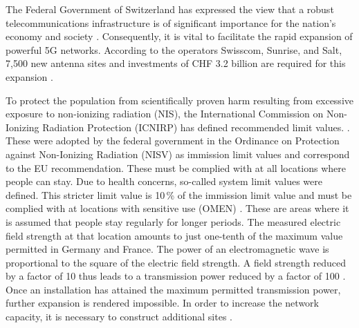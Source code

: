 \begin{English}
    The Federal Government of Switzerland has expressed the view that a robust telecommunications infrastructure is of significant importance for the nation's economy and society \cite{bundesratNachhaltigesMobilfunknetzBericht2022}. Consequently, it is vital to facilitate the rapid expansion of powerful 5G networks. According to the operators Swisscom, Sunrise, and Salt, 7,500 new antenna sites and investments of CHF 3.2 billion are required for this expansion \cite{bundesratNachhaltigesMobilfunknetzBericht2022}.

    To protect the population from scientifically proven harm resulting from excessive exposure to non-ionizing radiation (NIS), the International Commission on Non-Ionizing Radiation Protection (ICNIRP) has defined recommended limit values. \cite{baumannMitVerordnungUeber2005}. These were adopted by the federal government in the Ordinance on Protection against Non-Ionizing Radiation (NISV) as immission limit values and correspond to the EU recommendation. These must be complied with at all locations where people can stay. Due to health concerns, so-called system limit values were defined. This stricter limit value is 10\,\% of the immission limit value and must be complied with at locations with sensitive use (OMEN) \cite{baumannMitVerordnungUeber2005}. These are areas where it is assumed that people stay regularly for longer periods. The measured electric field strength at that location amounts to just one-tenth of the maximum value permitted in Germany and France. The power of an electromagnetic wave is proportional to the square of the electric field strength. A field strength reduced by a factor of 10 thus leads to a transmission power reduced by a factor of 100 \cite{chance5gAnlagegrenzwerteImMobilfunk}. Once an installation has attained the maximum permitted transmission power, further expansion is rendered impossible. In order to increase the network capacity, it is necessary to construct additional sites \cite{bundesratNachhaltigesMobilfunknetzBericht2022}.
\end{English}



